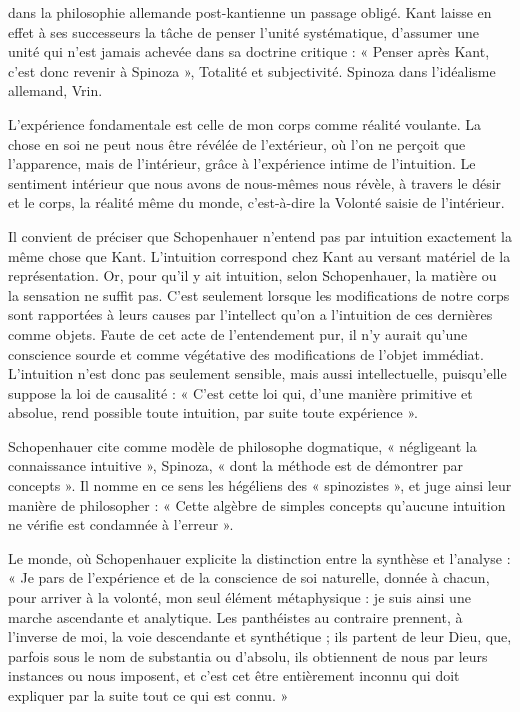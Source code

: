 dans la philosophie allemande post-kantienne un passage obligé. Kant laisse en effet à ses successeurs la
tâche de penser l’unité systématique, d’assumer une unité qui n’est jamais achevée dans sa doctrine critique :
« Penser après Kant, c’est donc revenir à Spinoza », Totalité et subjectivité. Spinoza dans l’idéalisme
allemand, Vrin.

L’expérience fondamentale est celle de mon corps comme réalité voulante.
La chose en soi ne peut nous être révélée de l’extérieur, où l’on ne perçoit que l’apparence, mais de
l’intérieur, grâce à l’expérience intime de l’intuition. Le sentiment intérieur que nous avons de nous-mêmes
nous révèle, à travers le désir et le corps, la réalité même du monde, c’est-à-dire la Volonté saisie de
l’intérieur.

Il convient de préciser que Schopenhauer n’entend pas par intuition exactement la même chose que Kant.
L’intuition correspond chez Kant au versant matériel de la représentation. Or, pour qu’il y ait intuition, selon
Schopenhauer, la matière ou la sensation ne suffit pas. C’est seulement lorsque les modifications de notre
corps sont rapportées à leurs causes par l’intellect qu’on a l’intuition de ces dernières comme objets. Faute de
cet acte de l’entendement pur, il n’y aurait qu’une conscience sourde et comme végétative des modifications
de l’objet immédiat. L’intuition n’est donc pas seulement sensible, mais aussi intellectuelle, puisqu’elle
suppose la loi de causalité : « C’est cette loi qui, d’une manière primitive et absolue, rend possible toute
intuition, par suite toute expérience ».

Schopenhauer cite comme modèle de philosophe dogmatique, « négligeant la connaissance intuitive »,
Spinoza, « dont la méthode est de démontrer par concepts ». Il nomme en ce sens les hégéliens des
« spinozistes », et juge ainsi leur manière de philosopher : « Cette algèbre de simples concepts qu’aucune
intuition ne vérifie est condamnée à l’erreur ».

Le monde, où Schopenhauer explicite la distinction entre la
synthèse et l’analyse : « Je pars de l’expérience et de la conscience de soi naturelle, donnée à chacun, pour
arriver à la volonté, mon seul élément métaphysique : je suis ainsi une marche ascendante et analytique. Les
panthéistes au contraire prennent, à l’inverse de moi, la voie descendante et synthétique ; ils partent de leur
Dieu, que, parfois sous le nom de substantia ou d’absolu, ils obtiennent de nous par leurs instances ou nous
imposent, et c’est cet être entièrement inconnu qui doit expliquer par la suite tout ce qui est connu. »

